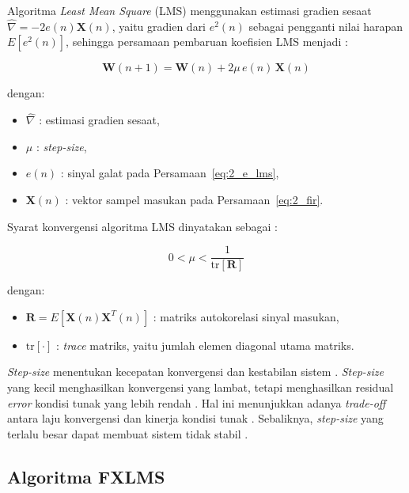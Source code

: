 Algoritma \emph{Least Mean Square} (LMS) menggunakan estimasi gradien sesaat $\hat{\nabla} = -2e(n)\mathbf{X}(n)$, yaitu gradien dari $e^2(n)$ sebagai pengganti nilai harapan $E[e^2(n)]$, sehingga persamaan pembaruan koefisien LMS menjadi \parencite{zhangrs2023}:

\begin{equation}
  \label{eq:2_lms}
  \mathbf{W}(n+1) = \mathbf{W}(n) + 2\mu\,e(n)\,\mathbf{X}(n)
\end{equation}

dengan:
\begin{itemize}[noitemsep, topsep=2pt]
  \item $\hat{\nabla}$ : estimasi gradien sesaat,
  \item $\mu$ : \emph{step-size},
  \item $e(n)$ : sinyal galat pada Persamaan~\eqref{eq:2_e_lms},
  \item $\mathbf{X}(n)$ : vektor sampel masukan pada Persamaan~\eqref{eq:2_fir}.
\end{itemize}

Syarat konvergensi algoritma LMS dinyatakan sebagai \parencite{zhangrs2023}:

\begin{equation}
  \label{eq:2_bound}
  0 < \mu < \frac{1}{\mathrm{tr}[\mathbf{R}]}
\end{equation}

dengan:
\begin{itemize}[noitemsep, topsep=2pt]
  \item $\mathbf{R} = E[\mathbf{X}(n)\mathbf{X}^T(n)]$ : matriks autokorelasi sinyal masukan,
  \item $\mathrm{tr}[\cdot]$ : \emph{trace} matriks, yaitu jumlah elemen diagonal utama matriks.
\end{itemize}

\emph{Step-size} menentukan kecepatan konvergensi dan kestabilan sistem \parencite{zhangrs2023,chen2025}. \emph{Step-size} yang kecil menghasilkan konvergensi yang lambat, tetapi menghasilkan residual \emph{error} kondisi tunak yang lebih rendah \parencite{li2026}. Hal ini menunjukkan adanya \emph{trade-off} antara laju konvergensi dan kinerja kondisi tunak \parencite{sarkar2025}. Sebaliknya, \emph{step-size} yang terlalu besar dapat membuat sistem tidak stabil \parencite{chen2025}.

\subsection{Algoritma FXLMS}
\label{sec:fxlms}

